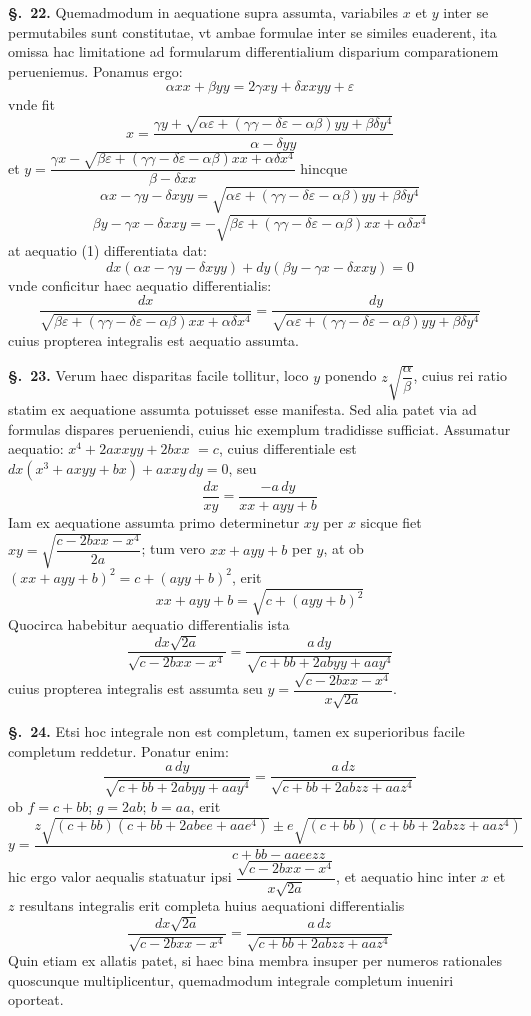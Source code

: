\documentclass{article}
\begin{document}
\textbf{§.~22.} Quemadmodum in aequatione supra assumta, variabiles $x$ et $y$ inter se
permutabiles sunt constitutae, vt ambae formulae inter se similes euaderent, ita omissa hac
limitatione ad formularum differentialium disparium comparationem perueniemus. Ponamus ergo:
\[ \alpha xx + \beta yy = 2\gamma xy + \delta xxyy + \varepsilon \tag{1} \]
vnde fit
\[ x = \frac{\gamma y + \sqrt{\alpha\varepsilon + (\gamma\gamma - \delta\varepsilon - \alpha\beta)yy + \beta\delta y^{4}}}{\alpha - \delta yy} \]
et $y = \dfrac{\gamma x - \sqrt{\beta\varepsilon + (\gamma\gamma - \delta\varepsilon - \alpha\beta)xx + \alpha\delta x^{4}}}{\beta - \delta xx}$
hincque
\[ \alpha x - \gamma y - \delta xyy = \sqrt{\alpha\varepsilon + (\gamma\gamma - \delta\varepsilon - \alpha\beta)yy + \beta\delta y^{4}} \tag{2} \]
\[ \beta y - \gamma x - \delta xxy = -\sqrt{\beta\varepsilon + (\gamma\gamma - \delta\varepsilon - \alpha\beta)xx + \alpha\delta x^{4}} \tag{3} \]
at aequatio (1) differentiata dat:
\[ dx(\alpha x - \gamma y - \delta xyy) + dy(\beta y - \gamma x - \delta xxy) = 0 \]
vnde conficitur haec aequatio differentialis:
\[ \frac{dx}{\sqrt{\beta\varepsilon + (\gamma\gamma - \delta\varepsilon - \alpha\beta)xx + \alpha\delta x^{4}}}
   = \frac{dy}{\sqrt{\alpha\varepsilon + (\gamma\gamma - \delta\varepsilon - \alpha\beta)yy + \beta\delta y^{4}}} \]
cuius propterea integralis est aequatio assumta.

\textbf{§.~23.} Verum haec disparitas facile tollitur, loco $y$ ponendo $z\sqrt{\dfrac{\alpha}{\beta}}$,
cuius rei ratio statim ex aequatione assumta potuisset esse manifesta. Sed alia patet via ad
formulas dispares perueniendi, cuius hic exemplum tradidisse sufficiat. Assumatur aequatio:
$x^{4} + 2axxyy + 2bxx$
${}= c$, cuius differentiale est $dx(x^{3} + axyy + bx) + axxy\,dy = 0$, seu
\[ \frac{dx}{xy} = \frac{-a\,dy}{xx + ayy + b} \]
Iam ex aequatione assumta primo determinetur $xy$ per $x$ sicque fiet
$xy = \sqrt{\dfrac{c - 2bxx - x^{4}}{2a}}$; tum vero $xx + ayy + b$ per $y$, at ob
$(xx + ayy + b)^{2} = c + (ayy + b)^{2}$, erit
\[ xx + ayy + b = \sqrt{c + (ayy + b)^{2}} \]
Quocirca habebitur aequatio differentialis ista
\[ \frac{dx\sqrt{2a}}{\sqrt{c - 2bxx - x^{4}}} = \frac{a\,dy}{\sqrt{c + bb + 2abyy + aay^{4}}} \]
cuius propterea integralis est assumta seu $y = \dfrac{\sqrt{c - 2bxx - x^{4}}}{x\sqrt{2a}}$.

\textbf{§.~24.} Etsi hoc integrale non est completum, tamen ex superioribus facile completum
reddetur. Ponatur enim:
\[ \frac{a\,dy}{\sqrt{c + bb + 2abyy + aay^{4}}} = \frac{a\,dz}{\sqrt{c + bb + 2abzz + aaz^{4}}} \]
ob $f = c + bb$; $g = 2ab$; $b = aa$, erit
\[ y = \frac{z\sqrt{(c+bb)(c + bb + 2abee + aae^{4})} \pm e\sqrt{(c+bb)(c + bb + 2abzz + aaz^{4})}}{c + bb - aaeezz} \]
hic ergo valor aequalis statuatur ipsi $\dfrac{\sqrt{c - 2bxx - x^{4}}}{x\sqrt{2a}}$, et aequatio hinc
inter $x$ et $z$ resultans integralis erit completa huius aequationi differentialis
\[ \frac{dx\sqrt{2a}}{\sqrt{c - 2bxx - x^{4}}} = \frac{a\,dz}{\sqrt{c + bb + 2abzz + aaz^{4}}} \]
Quin etiam ex allatis patet, si haec bina membra insuper per numeros rationales quoscunque
multiplicentur, quemadmodum integrale completum inueniri oporteat.
\end{document}
